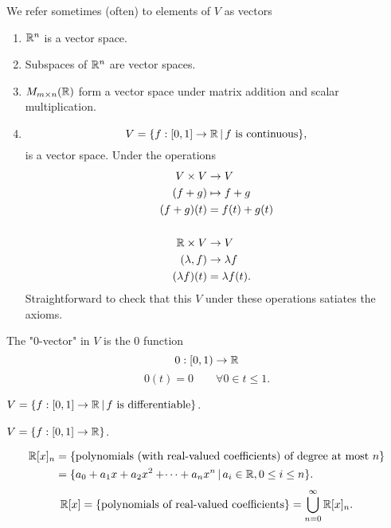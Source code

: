 \documentclass[10pt, a4paper]{article}
\begin{document}
We refer sometimes (often) to elements of $V$ as vectors

\begin{example}\phantom{}
    \begin{enumerate}[label = (\roman*)]
        \item $\mathbb{R} ^ n$ is a vector space.
        \item Subspaces of $\mathbb{R} ^ n$ are vector spaces.
        \item $M_{m \times n}(\mathbb{R})$ form a vector space under matrix addition and scalar multiplication.
        \item
        \[
        V = \{f : [0, 1] \rightarrow \mathbb{R}\,|\, f \text{ is continuous}\},
        \]
        is a vector space.
        Under the operations
        \begin{align*}
            V \times V &\rightarrow V \\
            (f + g) &\mapsto f + g \\
            (f + g)(t) &= f(t) + g(t) \\
            \phantom{} \\
            \mathbb{R} \times V &\rightarrow V \\
            (\lambda, f) &\rightarrow \lambda f \\
            (\lambda f)(t) &= \lambda f(t).
        \end{align*}
        Straightforward to check that this $V$ under these operations satiates the axioms.
    \end{enumerate}
\end{example}

The "$0$-vector" in $V$ is the $0$ function
\[
0 : [0, 1) \rightarrow \mathbb{R}
\]
\[
0(t) = 0\qquad\forall 0 \in t \leq 1.
\]
\begin{example}
    $V = \{f : [0, 1] \rightarrow \mathbb{R}\,|\, f\text{ is differentiable}\}$.
\end{example}
\begin{example}
    $V = \{f : [0, 1] \rightarrow \mathbb{R}\}$.
\end{example}
\begin{example}
    \begin{align*}
    \mathbb{R}[x]_n &= \{\text{polynomials (with real-valued coefficients) of degree at most } n\} \\
    &= \{a_0 + a_1x + a_2x ^ 2 + \dotsi + a_nx ^ n\,|\, a_i \in \mathbb{R}, 0 \leq i \leq n\}.
    \end{align*}
    \[
    \mathbb{R}[x] = \{\text{polynomials of real-valued coefficients}\} = \bigcup_{n = 0}^{\infty}\mathbb{R}[x]_n.
    \]
\end{example}
\end{document}
